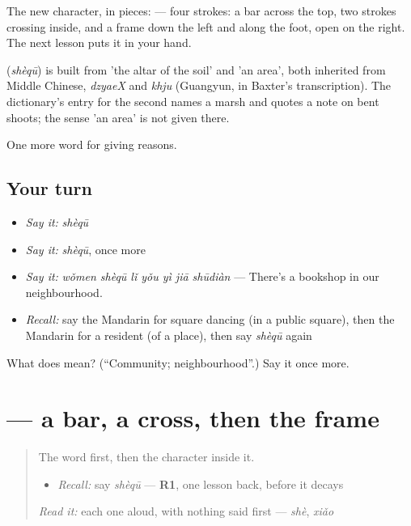 The new character, in pieces:  — four strokes: a bar across the top, two strokes crossing inside, and a frame down the left and along the foot, open on the right. The next lesson puts it in your hand.

\begin{cousinweb}
\textbf{} (\emph{shèqū}) is built from  'the altar of the soil' and  'an area', both inherited from Middle Chinese, \emph{dzyaeX} and \emph{khju} (Guangyun, in Baxter's transcription). The dictionary's entry for the second names a marsh and quotes a note on bent shoots; the sense 'an area' is not given there.
\end{cousinweb}

\begin{grammarlens}[title={What you've built}]
One more word for giving reasons.
\end{grammarlens}

\subsection*{Your turn}
\begin{itemize}
\raggedright
  \item \emph{Say it:} \emph{shèqū}
  \item \emph{Say it:} \emph{shèqū}, once more
  \item \emph{Say it:} \emph{wǒmen shèqū lǐ yǒu yì jiā shūdiàn} — There's a bookshop in our neighbourhood.
  \item \emph{Recall:} say the Mandarin for square dancing (in a public square), then the Mandarin for a resident (of a place), then say \emph{shèqū} again
\end{itemize}

\begin{tcolorbox}[breakable,colback=teal!4,colframe=teal!35!black,title={Before you move on}]
What does  mean? (\textquotedblleft{}Community; neighbourhood\textquotedblright{}.) Say it once more.
\end{tcolorbox}
\section[\texorpdfstring{\zh{区} (qū)}{区 (qū)}]{ — a bar, a cross, then the frame}

\label{lesson:ZH-W377-qu-area}



\begin{quote}
The word first, then the character inside it.

\begin{itemize}
\raggedright
  \item \emph{Recall:} say \emph{shèqū} — \textbf{R1}, one lesson back, before it decays
\end{itemize}

\begin{quote}
 
\end{quote}

\emph{Read it:} each one aloud, with nothing said first — \emph{shè}, \emph{xiǎo}
\end{quote}

